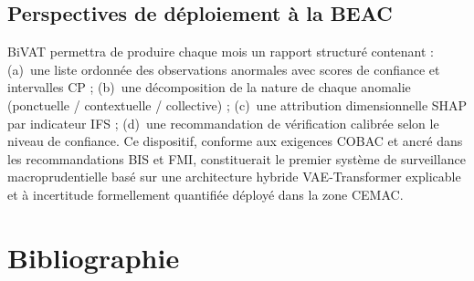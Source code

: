 \documentclass[12pt,a4paper]{article}
\begin{document}
\subsection{Perspectives de déploiement à la BEAC}

BiVAT permettra de produire chaque mois un rapport structuré contenant :
(a)~une liste ordonnée des observations anormales avec scores de confiance et
intervalles CP ; (b)~une décomposition de la nature de chaque anomalie
(ponctuelle / contextuelle / collective) ; (c)~une attribution dimensionnelle
SHAP par indicateur IFS ; (d)~une recommandation de vérification calibrée selon
le niveau de confiance. Ce dispositif, conforme aux exigences COBAC et ancré
dans les recommandations BIS et FMI, constituerait le premier système de
surveillance macroprudentielle basé sur une architecture hybride VAE-Transformer
explicable et à incertitude formellement quantifiée déployé dans la zone CEMAC.

\section*{Bibliographie}
\end{document}

